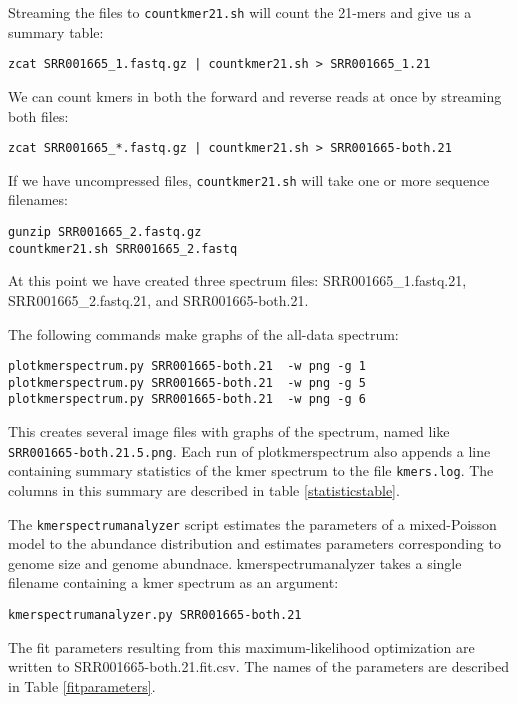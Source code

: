 \documentclass[11pt,fullpage]{article}
\begin{document}
Streaming the files to \texttt{countkmer21.sh} will count the 21-mers and give us a summary table:
\begin{verbatim}
zcat SRR001665_1.fastq.gz | countkmer21.sh > SRR001665_1.21
\end{verbatim}

We can count kmers in both the forward and reverse reads at once by streaming both files:
\begin{verbatim}
zcat SRR001665_*.fastq.gz | countkmer21.sh > SRR001665-both.21
\end{verbatim}

If we have uncompressed files, \texttt{countkmer21.sh} will take one or more sequence filenames:
\begin{verbatim}
gunzip SRR001665_2.fastq.gz
countkmer21.sh SRR001665_2.fastq
\end{verbatim}
At this point we have created three spectrum files: SRR001665\_1.fastq.21,  SRR001665\_2.fastq.21,  and SRR001665-both.21.

The following commands make graphs of the all-data spectrum:
\begin{verbatim}
plotkmerspectrum.py SRR001665-both.21  -w png -g 1
plotkmerspectrum.py SRR001665-both.21  -w png -g 5
plotkmerspectrum.py SRR001665-both.21  -w png -g 6
\end{verbatim}
This creates several image files with graphs of the spectrum, named like \texttt{SRR001665-both.21.5.png}.
Each run of plotkmerspectrum also appends a line containing summary statistics of the kmer spectrum to the
file \texttt{kmers.log}.  The columns in this summary are described in table \ref{statisticstable}.

The \texttt{kmerspectrumanalyzer} script estimates the parameters of a mixed-Poisson model to the abundance
distribution and estimates parameters
corresponding to genome size and genome abundnace.  kmerspectrumanalyzer takes a single filename containing a
kmer spectrum as an argument:

\begin{verbatim}
kmerspectrumanalyzer.py SRR001665-both.21
\end{verbatim}

The fit parameters resulting from this maximum-likelihood optimization are written to SRR001665-both.21.fit.csv.
The names of the parameters are described in Table \ref{fitparameters}.
\end{document}
